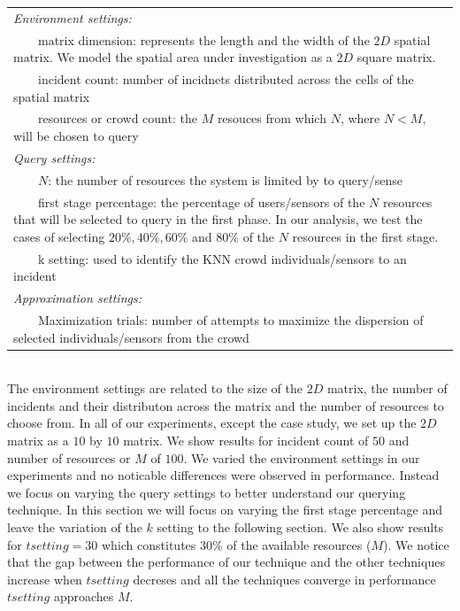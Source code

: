 \documentclass{acm_proc_article-sp}
\newcommand{\tabitem}{~~\llap{\textbullet}~~}
\begin{document}
\begin{tabulary}{0.5\textwidth}{|L|}
\hline
\textit{Environment settings: }\\
\tabitem matrix dimension: represents the length and 
the width of the $2D$ spatial matrix. We model the spatial area under investigation as a $2D$ square matrix.\\
\tabitem incident count: number of incidnets distributed across the cells of the spatial matrix\\
\tabitem resources or crowd count: the $M$ resouces from which $N$, where $N < M$, will be chosen to query\\
\hline
\textit{Query settings:}\\
\tabitem $N$: the number of resources the system is limited by to query/sense \\
\tabitem first stage percentage: the percentage of users/sensors of the $N$ resources that will be selected to query in the first phase. In our analysis, we test the cases of selecting $20\%, 40\%, 60\%$ and $80\%$ of the $N$ resources in the first stage.\\
\tabitem k setting: used to identify the KNN crowd individuals/sensors to an incident\\
\hline
\textit{Approximation settings: }\\
\tabitem Maximization trials: number of attempts to maximize the dispersion of selected individuals/sensors from the crowd\\
\hline
\end{tabulary}  
\label{table:1}\\

The environment settings are related to the size of the $2D$ matrix, the number of incidents and their distributon across the matrix and the number of resources to choose from. In all of our experiments, except the case study, we set up the $2D$ matrix as a $10$ by $10$ matrix. We show results for incident count of $50$ and  number of resources or $M$ of $100$. We varied the environment settings in our experiments and no noticable differences were observed in performance. Instead we focus on varying the query settings to better understand our querying technique. In this section we will focus on varying the first stage percentage and leave the variation of the $k$ setting to the following section. We also show results for $tsetting = 30$ which constitutes $30\%$ of the available resources ($M$). We notice that the gap between the performance of our technique and the other techniques increase when $tsetting$ decreses and all the techniques converge in performance $tsetting$ approaches $M$. 
  
\end{document}
